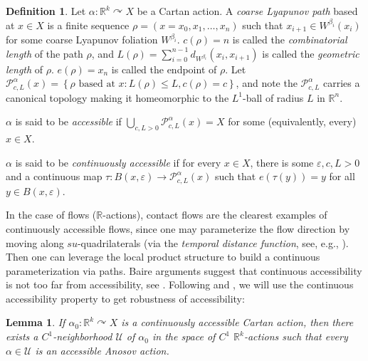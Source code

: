 \documentclass[12pt]{amsart}
\newtheorem{lemma}[theorem]{Lemma}
\theoremstyle{definition}
\newtheorem{definition}[theorem]{Definition}
\theoremstyle{remark}
\numberwithin{equation}{section}
\newcommand{\R}{\mathbb{R}}
\newcommand{\mc}{\mathcal}
\newcommand{\set}[1]{\left\lbrace #1 \right\rbrace}
\newcommand{\ve}{\varepsilon}
\newtheorem{Structural Stability Theorem}[theorem]{Structural Stability Theorem}
\begin{document}
\begin{definition}
\label{def:accessibility}
Let $\alpha : \R^k \curvearrowright X$ be a Cartan action. A {\it coarse Lyapunov path} based at $x \in X$ is a finite sequence $\rho = (x = x_0,x_1,\dots, x_n)$ such that $x_{i+1} \in W^{\beta_i}(x_i)$ for some coarse Lyapunov foliation $W^{\beta_i}$. $c(\rho) = n$ is called the {\it combinatorial length} of the path $\rho$, and $L(\rho) = \sum_{i=0}^{n-1} d_{W^{\beta_i}}(x_i,x_{i+1})$ is called the {\it geometric length} of $\rho$. $e(\rho) = x_n$ is called the endpoint of $\rho$. Let $\mc P_{c,L}^\alpha(x) = \set{ \rho \mbox{ based at } x : L(\rho) \le L, c(\rho) = c}$, and note the $\mc P_{c,L}^\alpha$ carries a canonical topology making it homeomorphic to the $L^1$-ball of radius $L$ in $\R^n$.

$\alpha$ is said to be {\it accessible} if $\bigcup_{c,L >0} \mc P_{c,L}^\alpha(x) = X$ for some (equivalently, every) $x\in X$.

$\alpha$ is said to be {\it continuously accessible} if for every $x \in X$, there is some $\ve,c,L > 0$ and a continuous map $\tau : B(x,\ve) \to \mc P_{c,L}^\alpha(x)$ such that $e(\tau(y)) = y$ for all $y \in B(x,\ve)$.
\end{definition}

In the case of flows ($\R$-actions), contact flows are the clearest examples of continuously accessible flows, since one may parameterize the flow direction by moving along $su$-quadrilaterals (via the {\it temporal distance function}, see, e.g., \cite[Appendices A \& B]{liverani04}). Then one can leverage the local product structure to build a continuous parameterization via paths. Baire arguments suggest that continuous accessibility is not too far from accessibility, see \cite[Proposition 7.2]{asv}. Following \cite[Section 3.4]{BPW} and \cite[Theorem 3.4]{ps97}, we will use the continuous accessibility property to get robustness of accessibility:

\begin{lemma}
If $\alpha_0 : \R^k \curvearrowright X$ is a continuously accessible Cartan action, then there exists a $C^1$-neighborhood $\mc U$ of $\alpha_0$ in the space of $C^1$ $\R^k$-actions such that every $\alpha \in \mc U$ is an accessible Anosov action.
\end{lemma}
\end{document}
